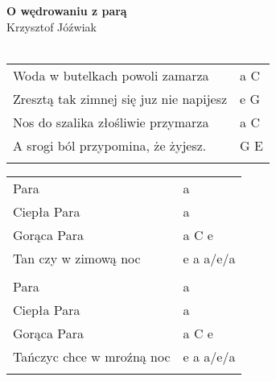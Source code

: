 \documentclass[a5paper]{article}
\begin{document}


\noindent
\fontsize{12pt}{15pt}\selectfont
\textbf{O wędrowaniu z parą} \\
\fontsize{8pt}{10pt}\selectfont
Krzysztof Jóźwiak \\ \\
\fontsize{10pt}{12pt}\selectfont
{}
\begin{tabular}{@{}p{7.50cm}p{3cm}@{}}
\noindent
Woda w butelkach powoli zamarza & a C \\
Zresztą tak zimnej się juz nie napijesz & e G \\
Nos do szalika złośliwie przymarza & a C \\
A srogi ból przypomina, że żyjesz. & G E \\\\
\end{tabular}

\noindent
\begin{tabular}{@{}p{6.50cm}p{3cm}@{}}
Para & a \\
Ciepła Para & a \\
Gorąca Para & a C e \\
Tan czy w zimową noc & e a a/e/a\\\\

Para & a \\
Ciepła Para & a \\
Gorąca Para & a C e \\
Tańczyc chce w mroźną noc & e a a/e/a \\ \\
\end{tabular}
\end{document}
